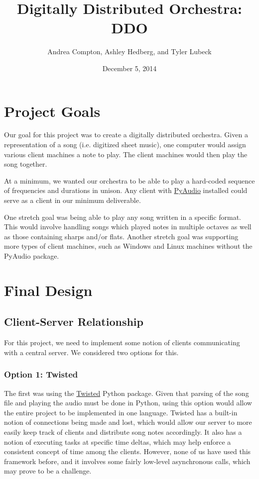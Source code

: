 \documentclass[12pt, letterpaper]{article}
\begin{document}
\title{Digitally Distributed Orchestra: DDO}
\author{Andrea Compton, Ashley Hedberg, and Tyler Lubeck}
\date{December 5, 2014}
\maketitle

\setcounter{tocdepth}{2}
\tableofcontents

\section{Project Goals}
Our goal for this project was to create a digitally distributed orchestra. Given a representation of a song (i.e. digitized sheet music), one computer would assign various client machines a note to play. The client machines would then play the song together.

At a minimum, we wanted our orchestra to be able to play a hard-coded sequence of frequencies and durations in unison. Any client with \href{http://people.csail.mit.edu/hubert/pyaudio/}{PyAudio} installed could serve as a client in our minimum deliverable.

One stretch goal was being able to play any song written in a specific format. This would involve handling songs which played notes in multiple octaves as well as those containing sharps and/or flats. Another stretch goal was supporting more types of client machines, such as Windows and Linux machines without the PyAudio package. 

\section{Final Design}

\subsection{Client-Server Relationship}
For this project, we need to implement some notion of clients communicating with a central server. We considered two options for this.
            
\subsubsection{Option 1: Twisted}
The first was using the \href{https://twistedmatrix.com/}{Twisted} Python package. Given that parsing of the song file and playing the audio must be done in Python, using this option would allow the entire project to be implemented in one language. Twisted has a built-in notion of connections being made and lost, which would allow our server to more easily keep track of clients and distribute song notes accordingly. It also has a notion of executing tasks at specific time deltas, which may help enforce a consistent concept of time among the clients. However, none of us have used this framework before, and it involves some fairly low-level asynchronous calls, which may prove to be a challenge.
            
\end{document}
